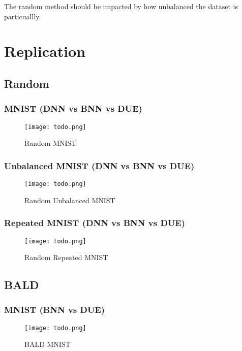 \documentclass[12pt, a4paper]{report}
\theoremstyle{definition}
\begin{document}
The random method should be impacted by how unbalanced the dataset is particuallly.

\section{Replication}

\subsection{Random}

\subsubsection{MNIST (DNN vs BNN vs DUE)}

\begin{figure}[H]
\centering
\texttt{[image: todo.png]}
\caption{Random MNIST}
\end{figure}

\subsubsection{Unbalanced MNIST (DNN vs BNN vs DUE)}

\begin{figure}[H]
\centering
\texttt{[image: todo.png]}
\caption{Random Unbalanced MNIST}
\end{figure}
\subsubsection{Repeated MNIST (DNN vs BNN vs DUE)}

\begin{figure}[H]
\centering
\texttt{[image: todo.png]}
\caption{Random Repeated MNIST}
\end{figure}

\subsection{BALD}

\subsubsection{MNIST (BNN vs DUE)}

\begin{figure}[H]
\centering
\texttt{[image: todo.png]}
\caption{BALD MNIST}
\end{figure}
\end{document}
